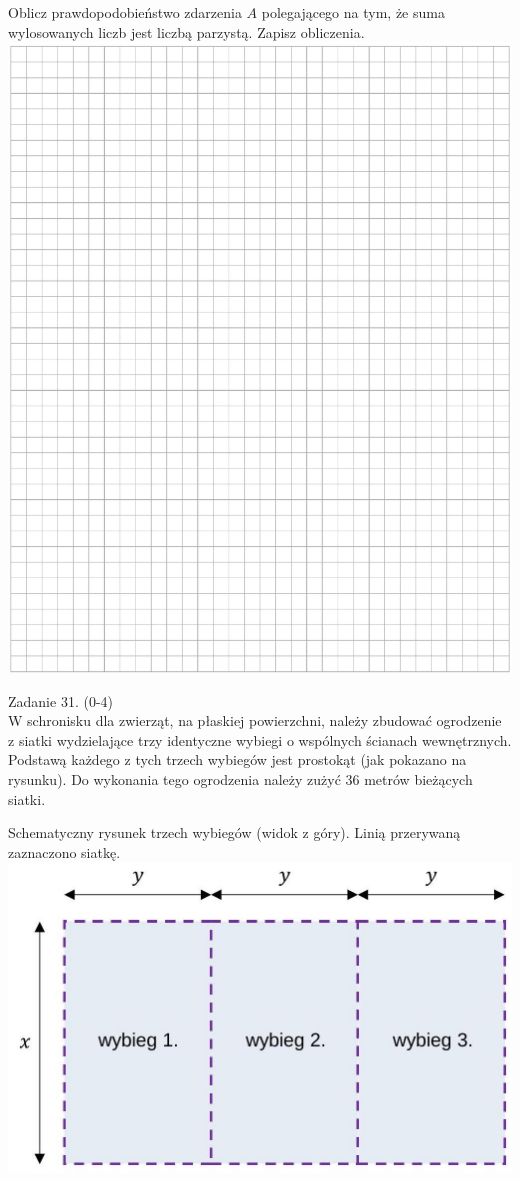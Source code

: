 \documentclass[10pt]{article}
\begin{document}
Oblicz prawdopodobieństwo zdarzenia \(A\) polegającego na tym, że suma wylosowanych liczb jest liczbą parzystą. Zapisz obliczenia.\\
\includegraphics[max width=\textwidth, center]{2024_11_21_daeb5e5efb43dd4cb535g-26}

Zadanie 31. (0-4)\\
W schronisku dla zwierząt, na płaskiej powierzchni, należy zbudować ogrodzenie z siatki wydzielające trzy identyczne wybiegi o wspólnych ścianach wewnętrznych.\\
Podstawą każdego z tych trzech wybiegów jest prostokąt (jak pokazano na rysunku). Do wykonania tego ogrodzenia należy zużyć 36 metrów bieżących siatki.

Schematyczny rysunek trzech wybiegów (widok z góry). Linią przerywaną zaznaczono siatkę.\\
\includegraphics[max width=\textwidth, center]{2024_11_21_daeb5e5efb43dd4cb535g-27}
\end{document}
